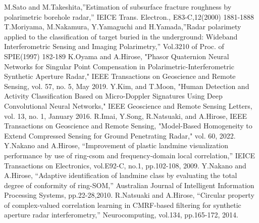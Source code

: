 \documentclass[12pt,a4paper]{jsreport}
\begin{document}
\begin{thebibliography}{99}
    M.Sato and M.Takeshita,”Estimation of subsurface fracture roughness by
    polarimetric borehole radar,” IEICE Trans. Electron., E83-C,12(2000) 1881-1888
    T.Moriyama, M.Nakamura, Y.Yamaguchi and H.Yamada,”Radar polarimety applied
    to the classification of target buried in the underground: Wideband Interferometric
    Sensing and Imaging Polarimetry,” Vol.3210 of Proc. of SPIE(1997) 182-189
     K.Oyama and A.Hirose, "Phasor Quaternion Neural Networks for Singular
     Point Compensation in Polarimetric-Interferometric
     Synthetic Aperture Radar," IEEE Transactions on Geoscience and Remote Sensing, vol. 57, no. 5, May 2019.
     Y.Kim, and T.Moon, "Human Detection and Activity Classification Based
     on Micro-Doppler Signatures Using Deep
     Convolutional Neural Networks," IEEE Geoscience and Remote Sensing Letters, vol. 13, no. 1, January 2016.
     R.Imai, Y.Song, R.Natsuaki, and A.Hirose, IEEE Transactions on Geoscience and Remote Sensing,
     "Model-Based Homogeneity to Extend Compressed Sensing for Ground Penetrating Radar," vol. 60, 2022.
     Y.Nakano and A.Hirose, “Improvement of plastic landmine visualization performance by use of ring-csom and frequency-domain local
     correlation,” IEICE Transactions on Electronics, vol.E92-C, no.1,
     pp.102-108, 2009.
     Y.Nakano and A.Hirose, “Adaptive identification of landmine class
     by evaluating the total degree of conformity of ring-SOM,” Australian
     Journal of Intelligent Information Processing Systems, pp.22-28,2010. %
    R.Natsuaki and A.Hirose, “Circular property of complex-valued
    correlation learning in CMRF-based filtering for synthetic aperture
    radar interferometry,” Neurocomputing, vol.134, pp.165-172, 2014.
   
    
     
   
    
     \end{thebibliography}
\end{document}
